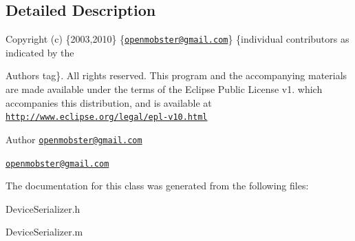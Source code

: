 \subsection{\-Detailed \-Description}
\-Copyright (c) \{2003,2010\} \{\href{mailto:openmobster@gmail.com}{\tt openmobster@gmail.\-com}\} \{individual contributors as indicated by the \begin{DoxyAuthor}{\-Authors}
tag\}. \-All rights reserved. \-This program and the accompanying materials are made available under the terms of the \-Eclipse \-Public \-License v1. which accompanies this distribution, and is available at \href{http://www.eclipse.org/legal/epl-v10.html}{\tt http\-://www.\-eclipse.\-org/legal/epl-\/v10.\-html}
\end{DoxyAuthor}
\begin{DoxyAuthor}{\-Author}
\href{mailto:openmobster@gmail.com}{\tt openmobster@gmail.\-com}

\href{mailto:openmobster@gmail.com}{\tt openmobster@gmail.\-com} 
\end{DoxyAuthor}


\-The documentation for this class was generated from the following files\-:\begin{DoxyCompactItemize}
\item 
\-Device\-Serializer.\-h\item 
\-Device\-Serializer.\-m\end{DoxyCompactItemize}
